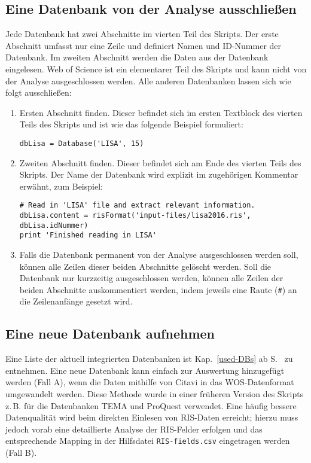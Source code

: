 \subsection{Eine Datenbank von der Analyse ausschließen}
Jede Datenbank hat zwei Abschnitte im vierten Teil des Skripts. Der erste Abschnitt umfasst nur eine Zeile und definiert Namen und ID-Nummer der Datenbank. Im zweiten Abschnitt werden die Daten aus der Datenbank eingelesen. Web of Science ist ein elementarer Teil des Skripts und kann nicht von der Analyse ausgeschlossen werden. Alle anderen Datenbanken lassen sich wie folgt ausschließen:
\begin{enumerate}
\item Ersten Abschnitt finden. Dieser befindet sich im ersten Textblock des vierten Teils des Skripts und ist wie das folgende Beispiel formuliert:
\begin{verbatim}
dbLisa = Database('LISA', 15)
\end{verbatim}
\item Zweiten Abschnitt finden. Dieser befindet sich am Ende des vierten Teils des Skripts. Der Name der Datenbank wird explizit im zugehörigen Kommentar erwähnt, zum Beispiel:
\begin{verbatim}
# Read in 'LISA' file and extract relevant information.
dbLisa.content = risFormat('input-files/lisa2016.ris', dbLisa.idNummer)
print 'Finished reading in LISA'
\end{verbatim}
\item Falls die Datenbank permanent von der Analyse ausgeschlossen werden soll, können alle Zeilen dieser beiden Abschnitte gelöscht werden. Soll die Datenbank nur kurzzeitig ausgeschlossen werden, können alle Zeilen der beiden Abschnitte auskommentiert werden, indem jeweils eine Raute (\texttt{\#}) an die Zeilenanfänge gesetzt wird.
\end{enumerate}

\subsection{Eine neue Datenbank aufnehmen}
Eine Liste der aktuell integrierten Datenbanken ist Kap.~\ref{used-DBs} ab S.~\pageref{used-DBs} zu entnehmen. Eine neue Datenbank kann einfach zur Auswertung hinzugefügt werden (Fall A), wenn die Daten mithilfe von Citavi in das WOS-Datenformat umgewandelt werden. Diese Methode wurde in einer früheren Version des Skripts z.\,B. für die Datenbanken TEMA und ProQuest verwendet. Eine häufig bessere Datenqualität wird beim direkten Einlesen von RIS-Daten erreicht; hierzu muss jedoch vorab eine detaillierte Analyse der RIS-Felder erfolgen und das entsprechende Mapping in der Hilfsdatei \texttt{RIS-fields.csv} eingetragen werden (Fall B).

